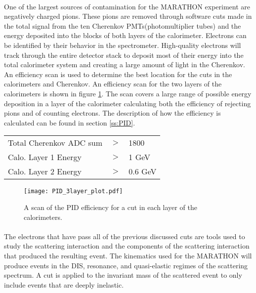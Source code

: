 \paragraph{}One of the largest sources of contamination for the MARATHON experiment are negatively charged pions. These pions are removed through software cuts made in the total signal from the ten Cherenkov PMTs(photomultiplier tubes) and the energy deposited into the blocks of both layers of the calorimeter. Electrons can be identified by their behavior in the spectrometer. High-quality electrons will track through the entire detector stack to deposit most of their energy into the total calorimeter system and creating a large amount of light in the Cherenkov. An efficiency scan is used to determine the best location for the cuts in the calorimeters and Cherenkov. An efficiency scan for the two layers of the calorimeters is shown in figure \ref{cal_pidscan}. The scan covers a large range of possible energy deposition in a layer of the calorimeter calculating both the efficiency of rejecting pions and of counting electrons. The description of how the efficiency is calculated can be found in section \ref{ss:PID}.

\begin{tabular}{@{$\bullet$ }lll}
	Total Cherenkov ADC sum &$>$ &1800\\
	Calo. Layer 1 Energy &$>$ & 1 GeV\\
	Calo. Layer 2 Energy &$>$ & 0.6 GeV
\end{tabular}

\begin{figure}[]
	\centering

	\texttt{[image: PID\_3layer\_plot.pdf]}
	
	\caption{ A scan of the PID efficiency for a cut in each layer of the calorimeters.}
	\label{cal_pidscan}
\end{figure}

\paragraph{}The electrons that have pass all of the previous discussed cuts are tools used to study the scattering interaction and the components of the scattering interaction that produced the resulting event. The kinematics used for the MARATHON will produce events in the DIS, resonance, and quasi-elastic regimes of the scattering spectrum. A cut is applied to the invariant mass of the scattered event to only include events that are deeply inelastic. 

